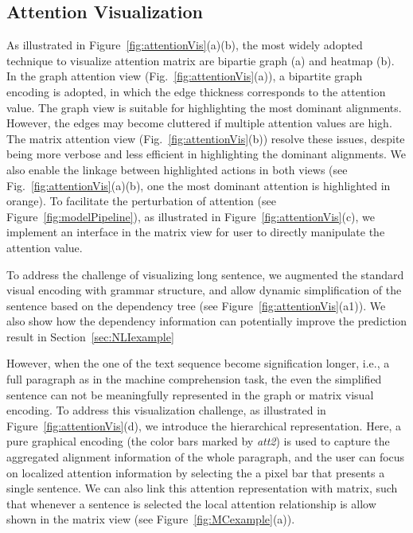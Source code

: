 \subsection{Attention Visualization}
As illustrated in Figure~\ref{fig:attentionVis}(a)(b), the most widely adopted technique to visualize attention matrix are bipartie graph (a) and heatmap (b). 
%
In the graph attention view (Fig.~\ref{fig:attentionVis}(a)), a bipartite graph encoding is adopted, in which the edge thickness corresponds to the attention value. %
%
The graph view is suitable for highlighting the most dominant alignments. However, the edges may become cluttered if multiple attention values are high. The matrix attention view (Fig.~\ref{fig:attentionVis}(b)) resolve these issues, despite being more verbose and less efficient in highlighting the dominant alignments. 
We also enable the linkage between highlighted actions in both views (see Fig.~\ref{fig:attentionVis}(a)(b), one the most dominant attention is highlighted in orange).
%
To facilitate the perturbation of attention (see Figure~\ref{fig:modelPipeline}), as illustrated in Figure~\ref{fig:attentionVis}(c), we implement an interface in the matrix view for user to directly manipulate the attention value.

To address the challenge of visualizing long sentence, we augmented the standard visual encoding with grammar structure, and allow dynamic simplification of the sentence based on the dependency tree (see Figure~\ref{fig:attentionVis}(a1)). We also show how the dependency information can potentially improve the prediction result in Section~\ref{sec:NLIexample}

However, when the one of the text sequence become signification longer, i.e., a full paragraph as in the machine comprehension task, the even the simplified sentence can not be meaningfully represented in the graph or matrix visual encoding. To address this visualization challenge, as illustrated in Figure~\ref{fig:attentionVis}(d), we introduce the hierarchical representation. Here, a pure graphical encoding (the color bars marked by \emph{att2}) is used to capture the aggregated alignment information of the whole paragraph, and the user can focus on localized attention information by selecting the a pixel bar that presents a single sentence. We can also link this attention representation with matrix, such that whenever a sentence is selected the local attention relationship is allow shown in the matrix view (see Figure~\ref{fig:MCexample}(a)).

